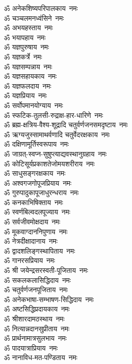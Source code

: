 \begin{flushleft}
\begin{multicols}{2}
ॐ अनेकशिष्यपरिपालकाय~नमः\\
ॐ चञ्चलमनध्वंसिने~नमः\\
ॐ अभयहस्ताय~नमः\\
ॐ भयापहाय~नमः\\
ॐ यज्ञपुरुषाय~नमः\hfill{}\\
ॐ यज्ञकर्त्रे~नमः\\
ॐ यज्ञसम्पन्नाय~नमः\\
ॐ यज्ञसहायकाय~नमः\\
ॐ यज्ञफलदाय~नमः\\
ॐ यज्ञप्रियाय~नमः\\
ॐ सर्वोपमानयोग्याय~नमः\\
ॐ स्फटिक-तुलसी-रुद्राक्ष-हार-धारिणे~नमः\\
ॐ ब्रह्म-क्षत्रिय-वैश्य-शूद्रादि चतुर्वर्णजनसमदृष्टाय~नमः\\
ॐ ऋग्यजुस्सामाथर्वणादि चतुर्वेदरक्षकाय~नमः\\
ॐ दक्षिणामूर्तिस्वरूपाय~नमः\hfill{}\\
ॐ जाग्रत्-स्वप्न-सुषुप्त्याद्यवस्थानुग्रहाय~नमः\\
ॐ कोटिसूर्यप्रकाशतेजोमय\-शरीराय~नमः\\
ॐ साधुसङ्गरक्षकाय~नमः\\
ॐ अश्वगजगोपूजप्रियाय~नमः\\
ॐ गुरुपादुकापूजाधुरन्धराय~नमः\\
ॐ कनकाभिषिक्ताय~नमः\\
ॐ स्वर्णबिल्वदलपूज्याय~नमः\\
ॐ सर्वजीवमोक्षदाय~नमः\\
ॐ मूकवाग्दाननिपुणाय~नमः\\
ॐ नेत्रदीक्षादानाय~नमः\hfill{}\\
ॐ द्वादशलिङ्गस्थापिताय~नमः\\
ॐ गानरसप्रियाय~नमः\\
ॐ श्री जयेन्द्रसरस्वती-पूजिताय~नमः\\
ॐ सकलकलासिद्धिदाय~नमः\\
ॐ चतुर्वर्णजनपूजिताय~नमः\\
ॐ अनेकभाषा-सम्भाषण-सिद्धिदाय~नमः\\
ॐ अष्टसिद्धिप्रदायकाय~नमः\\
ॐ श्रीशारदामठस्थाय~नमः\\
ॐ नित्यान्नदानसुप्रीताय~नमः\\
ॐ प्रार्थनामात्रसुलभाय~नमः\hfill{}\\
ॐ पादयात्राप्रियाय~नमः\\
ॐ नानाविध-मत-पण्डिताय~नमः\\

\end{multicols}
\end{flushleft}
